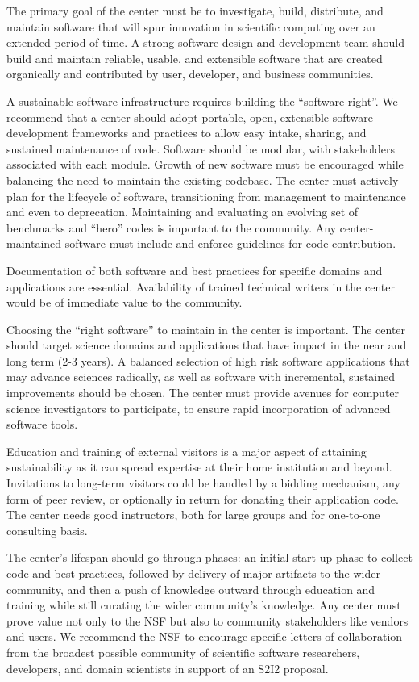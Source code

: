 The primary goal of the center must be to investigate, build, distribute, and maintain software that will spur innovation in scientific computing over an extended period of time. A strong software design and development team should build and maintain reliable, usable, and extensible software that are created organically and contributed by user, developer, and business communities.

A sustainable software infrastructure requires building the “software right”. We recommend that a center should adopt portable, open, extensible software development frameworks and practices to allow easy intake, sharing, and sustained maintenance of code. Software should be modular, with stakeholders associated with each module. Growth of new software must be encouraged while balancing the need to maintain the existing codebase. The center must actively plan for the lifecycle of software, transitioning from management to maintenance and even to deprecation. Maintaining and evaluating an evolving set of benchmarks and “hero” codes is important to the community. Any center-maintained software must include and enforce guidelines for code contribution.

Documentation of both software and best practices for specific domains and applications are essential. Availability of trained technical writers in the center would be of immediate value to the community.

Choosing the “right software” to maintain in the center is important. The center should target science domains and applications that have impact in the near and long term (2-3 years). A balanced selection of high risk software applications that may advance sciences radically, as well as software with incremental, sustained improvements should be chosen. The center must provide avenues for computer science investigators to participate, to ensure rapid incorporation of advanced software tools.

Education and training of external visitors is a major aspect of attaining sustainability as it can spread expertise at their home institution and beyond. Invitations to long-term visitors could be handled by a bidding mechanism, any form of peer review, or optionally in return for donating their application code. The center needs good instructors, both for large groups and for one-to-one consulting basis.

The center’s lifespan should go through phases: an initial start-up phase to collect code and best practices, followed by delivery of major artifacts to the wider community, and then a push of knowledge outward through education and training while still curating the wider community’s knowledge. Any center must prove value not only to the NSF but also to community stakeholders like vendors and users. We recommend the NSF to encourage specific letters of collaboration from the broadest possible community of scientific software researchers, developers, and domain scientists in support of an S2I2 proposal.
